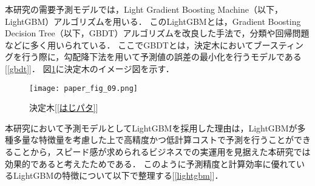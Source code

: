 \documentclass[dvipdfmx]{jreport}
\begin{document}
本研究の需要予測モデルでは，Light Gradient Boosting Machine（以下，LightGBM）アルゴリズムを用いる．
このLightGBMとは，Gradient Boosting Decision Tree（以下，GBDT）アルゴリズムを改良した手法で，分類や回帰問題などに多く用いられている．
ここでGBDTとは，決定木においてブースティングを行う際に，勾配降下法を用いて予測値の誤差の最小化を行うモデルである[\ref{gbdt}]．
図\ref{fig:09}に決定木のイメージ図を示す．

\begin{figure}[h]
    \begin{center}
        \texttt{[image: paper\_fig\_09.png]}
        \caption{決定木[\ref{はじパタ}]} \label{fig:09}
    \end{center}
\end{figure}

本研究において予測モデルとしてLightGBMを採用した理由は，LightGBMが多種多量な特徴量を考慮した上で高精度かつ低計算コストで予測を行うことができることから，スピード感が求められるビジネスでの実運用を見据えた本研究では効果的であると考えたためである．
このように予測精度と計算効率に優れているLightGBMの特徴について以下で整理する[\ref{lightgbm}]．
\end{document}

